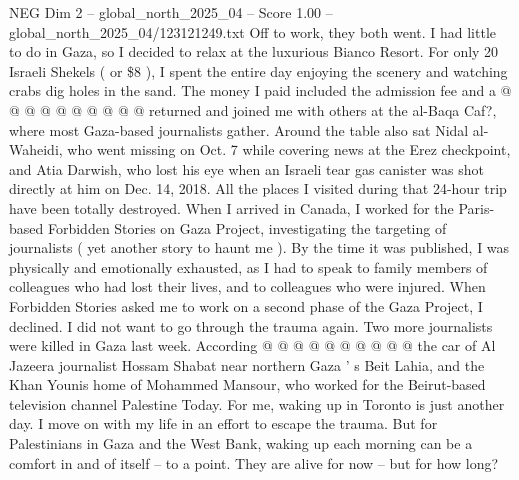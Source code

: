 \begin{textsample}{NEG Dim 2 – global\_north\_2025\_04 – Score 1.00 – global\_north\_2025\_04/123121249.txt}
Off to work, they both went.
I had little to do in Gaza, so I decided to relax at the luxurious Bianco Resort.
For only 20 Israeli Shekels ( or \$8 ), I spent the entire day enjoying the scenery and watching crabs dig holes in the sand.
The money I paid included the admission fee and a @ @ @ @ @ @ @ @ @ @ returned and joined me with others at the al-Baqa Caf?, where most Gaza-based journalists gather.
Around the table also sat Nidal al-Waheidi, who went missing on Oct. 7 while covering news at the Erez checkpoint, and Atia Darwish, who lost his eye when an Israeli tear gas canister was shot directly at him on Dec. 14, 2018.
All the places I visited during that 24-hour trip have been totally destroyed.
When I arrived in Canada, I worked for the Paris-based Forbidden Stories on Gaza Project, investigating the targeting of journalists ( yet another story to haunt me ).
By the time it was published, I was physically and emotionally exhausted, as I had to speak to family members of colleagues who had lost their lives, and to colleagues who were injured.
When Forbidden Stories asked me to work on a second phase of the Gaza Project, I declined.
I did not want to go through the trauma again.
Two more journalists were killed in Gaza last week.
According @ @ @ @ @ @ @ @ @ @ the car of Al Jazeera journalist Hossam Shabat near northern Gaza ' s Beit Lahia, and the Khan Younis home of Mohammed Mansour, who worked for the Beirut-based television channel Palestine Today.
For me, waking up in Toronto is just another day.
I move on with my life in an effort to escape the trauma.
But for Palestinians in Gaza and the West Bank, waking up each morning can be a comfort in and of itself -- to a point.
They are alive for now -- but for how long?

\end{textsample}
